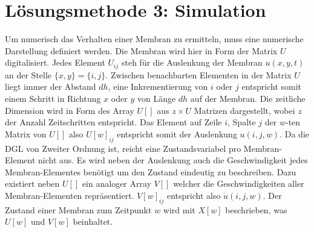 %
%
%
\section{Lösungsmethode 3: Simulation 
	\label{kreismembran:section:teil4}}

Um numerisch das Verhalten einer Membran zu ermitteln, muss eine numerische Darstellung definiert werden.
Die Membran wird hier in Form der Matrix $  U $ digitalisiert.
Jedes Element  $ U_{ij} $ steh für die Auslenkung der Membran $ u(x,y,t) $ an der Stelle $ \{x,y\}=\{i,j\} $.
Zwischen benachbarten Elementen in der Matrix $ U $ liegt immer der Abstand $ dh $, eine Inkrementierung von $ i $ oder $ j $ entspricht somit einem Schritt in Richtung $ x $ oder $ y $ von Länge $ dh $ auf der Membran.
Die zeitliche Dimension wird in Form des Array $  U[] $ aus $ z \times U $ Matrizen dargestellt, wobei $ z $ der Anzahl Zeitschritten entspricht.
Das Element auf Zeile $ i $, Spalte $ j $ der $ w $-ten Matrix von $ U[] $ also $ U[w]_{ij} $ entspricht somit der Auslenkung $ u(i,j,w) $.
Da die DGL von Zweiter Ordnung ist, reicht eine Zustandsvariabel pro Membran-Element nicht aus. 
Es wird neben der Auslenkung auch die Geschwindigkeit jedes Membran-Elementes benötigt um den Zustand eindeutig zu beschreiben. 
Dazu existiert neben $ U[] $ ein analoger Array $ V[] $ welcher die Geschwindigkeiten aller Membran-Elementen repräsentiert. 
$ V[w]_{ij} $ entspricht also $ \dot{u}(i,j,w) $. 
Der Zustand einer Membran zum Zeitpunkt $ w $ wird mit $ X[w] $ beschrieben, was $ U[w] $ und $ V[w] $ beinhaltet.


